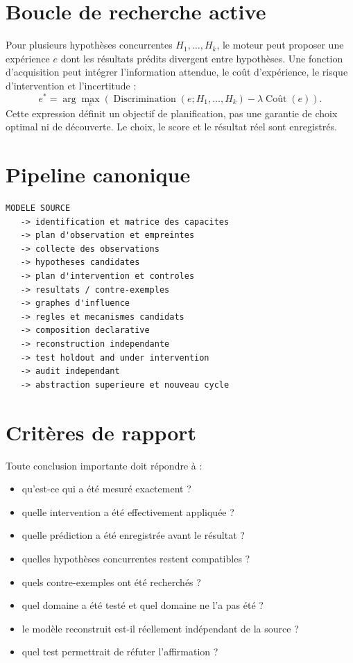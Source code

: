 \documentclass[11pt,a4paper]{article}
\begin{document}
\section{Boucle de recherche active}
Pour plusieurs hypothèses concurrentes $H_1,\dots,H_k$, le moteur peut proposer une expérience $e$ dont les résultats prédits divergent entre hypothèses. Une fonction d'acquisition peut intégrer l'information attendue, le coût d'expérience, le risque d'intervention et l'incertitude :
\[
e^*=\arg\max_e\left(\operatorname{Discrimination}(e;H_1,\ldots,H_k)-\lambda\operatorname{Co\text{ût}}(e)\right).
\]
Cette expression définit un objectif de planification, pas une garantie de choix optimal ni de découverte. Le choix, le score et le résultat réel sont enregistrés.

\section{Pipeline canonique}
\begin{lstlisting}
MODELE SOURCE
   -> identification et matrice des capacites
   -> plan d'observation et empreintes
   -> collecte des observations
   -> hypotheses candidates
   -> plan d'intervention et controles
   -> resultats / contre-exemples
   -> graphes d'influence
   -> regles et mecanismes candidats
   -> composition declarative
   -> reconstruction independante
   -> test holdout and under intervention
   -> audit independant
   -> abstraction superieure et nouveau cycle
\end{lstlisting}

\section{Critères de rapport}
Toute conclusion importante doit répondre à :
\begin{itemize}
\item qu'est-ce qui a été mesuré exactement ?
\item quelle intervention a été effectivement appliquée ?
\item quelle prédiction a été enregistrée avant le résultat ?
\item quelles hypothèses concurrentes restent compatibles ?
\item quels contre-exemples ont été recherchés ?
\item quel domaine a été testé et quel domaine ne l'a pas été ?
\item le modèle reconstruit est-il réellement indépendant de la source ?
\item quel test permettrait de réfuter l'affirmation ?
\end{itemize}
\end{document}
